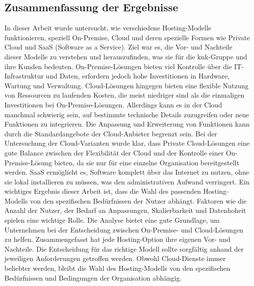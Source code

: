 \documentclass[12pt,bibtotoc]{article}
\begin{document}
		\subsection{Zusammenfassung der Ergebnisse}
		In dieser Arbeit wurde untersucht, wie verschiedene Hosting-Modelle funktionieren, speziell On-Premise, Cloud und deren spezielle Formen wie Private Cloud und SaaS (Software as a Service). Ziel war es, die Vor- und Nachteile dieser Modelle zu verstehen und herauszufinden, was sie für die knk-Gruppe und ihre Kunden bedeuten. \newline
		On-Premise-Lösungen bieten viel Kontrolle über die IT-Infrastruktur und Daten, erfordern jedoch hohe Investitionen in Hardware, Wartung und Verwaltung. Cloud-Lösungen hingegen bieten eine flexible Nutzung von Ressourcen zu laufenden Kosten, die meist niedriger sind als die einmaligen Investitionen bei On-Premise-Lösungen. \newline
		Allerdings kann es in der Cloud manchmal schwierig sein, auf bestimmte technische Details zuzugreifen oder neue Funktionen zu integrieren. Die Anpassung und Erweiterung von Funktionen kann durch die Standardangebote der Cloud-Anbieter begrenzt sein.\newline
		Bei der Untersuchung der Cloud-Varianten wurde klar, dass Private Cloud-Lösungen eine gute Balance zwischen der Flexibilität der Cloud und der Kontrolle einer On-Premise-Lösung bieten, da sie nur für eine einzelne Organisation bereitgestellt werden. SaaS ermöglicht es, Software komplett über das Internet zu nutzen, ohne sie lokal installieren zu müssen, was den administrativen Aufwand verringert. \newline
		Ein wichtiges Ergebnis dieser Arbeit ist, dass die Wahl des passenden Hosting-Modells von den spezifischen Bedürfnissen der Nutzer abhängt. Faktoren wie die Anzahl der Nutzer, der Bedarf an Anpassungen, Skalierbarkeit und Datenhoheit spielen eine wichtige Rolle. Die Analyse bietet eine gute Grundlage, um Unternehmen bei der Entscheidung zwischen On-Premise- und Cloud-Lösungen zu helfen.\newline
		Zusammengefasst hat jede Hosting-Option ihre eigenen Vor- und Nachteile. Die Entscheidung für das richtige Modell sollte sorgfältig anhand der jeweiligen Anforderungen getroffen werden. Obwohl Cloud-Dienste immer beliebter werden, bleibt die Wahl des Hosting-Modells von den spezifischen Bedürfnissen und Bedingungen der Organisation abhängig.
		\newpage
\end{document}
